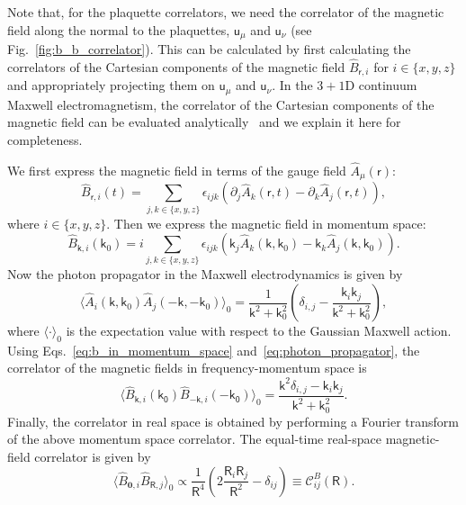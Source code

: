 \documentclass[twocolumn,superscriptaddress,amsmath,amssymb,aps,prx,nofootinbib]{revtex4-2}
\newcommand{\dual}[1]{\boldsymbol{\mathsf{#1}}}
\begin{document}
Note that, for the plaquette correlators, we need the correlator of the magnetic field along the normal to the plaquettes, $\dual{u}_\mu$ and $\dual{u}_\nu$ (see Fig.~\ref{fig:b_b_correlator}). 
This can be calculated by first calculating the correlators of the Cartesian components of the magnetic field $\hat{B}_{\dual{r},i}$ for $i \in \{ x,y,z \}$ and appropriately projecting them on $\dual{u}_\mu$ and $\dual{u}_\nu$. 
In the $3+1$D continuum Maxwell electromagnetism, the correlator of the Cartesian components of the magnetic field can be evaluated analytically~\cite{hermele2004} and we explain it here for completeness. 

We first express the magnetic field in terms of the gauge field $\hat{A}_\mu(\dual{r})$:
\begin{equation}
    \hat{B}_{\dual{r}, i} (t) = \sum_{j,k \in \{x,y,z\}} \epsilon_{ijk} \left( \partial_j \hat{A}_k(\dual{r},t) - \partial_k \hat{A}_j(\dual{r},t) \right),
\end{equation}
where $i \in \{ x,y,z\}$. Then we express the magnetic field in momentum space:
\begin{equation} \label{eq:b_in_momentum_space}
    \hat{B}_{\dual{k},i} (\mathsf{k}_0) = i\sum_{j,k \in \{x,y,z\}} \epsilon_{ijk} \left( \dual{k}_j \hat{A}_k(\dual{k}, \mathsf{k}_0) - \dual{k}_k \hat{A}_j(\dual{k}, \mathsf{k}_0) \right).
\end{equation}
Now the photon propagator in the Maxwell electrodynamics is given by
\begin{equation} \label{eq:photon_propagator}
    \langle \hat{A}_i (\dual{k}, \mathsf{k}_0) \hat{A}_j (-\dual{k}, -\mathsf{k}_0) \rangle_0 = \frac{1}{\mathsf{k}^2 + \mathsf{k}_0^2} \left( \delta_{i,j} - \frac{\mathsf{k}_i \mathsf{k}_j}{\mathsf{k}^2 + \mathsf{k}_0^2} \right),
\end{equation}
where  $\langle \cdot \rangle _0$ is the expectation value with respect to the Gaussian Maxwell action. Using Eqs.~\eqref{eq:b_in_momentum_space} and~\eqref{eq:photon_propagator}, the correlator of the magnetic fields in frequency-momentum space is
\begin{equation}
    \langle \hat{B}_{\dual{k},i} (\mathsf{k_0}) \hat{B}_{-\dual{k},i} (-\mathsf{k_0}) \rangle_0 = \frac{\mathsf{k}^2 \delta_{i,j} - \dual{k}_i\dual{k}_j}{\mathsf{k}^2 + \mathsf{k}_0^2}.
\end{equation}
Finally, the correlator in real space is obtained by performing a Fourier transform of the above momentum space correlator. The equal-time real-space magnetic-field correlator is given by~\cite{hermele2004}
\begin{equation}\label{eq:maxwellB2B2}
  \langle \hat{B}_{\boldsymbol{0},i} \hat{B}_{\dual{R},j} \rangle_0  \propto \frac{1}{\mathsf{R}^4} \left(2 \frac{\mathsf{R}_i \mathsf{R}_j}{\mathsf{R}^2} - \delta_{ij} \right)\equiv \mathcal{C}_{ij}^{B} (\dual{R}) .
\end{equation}
\end{document}
